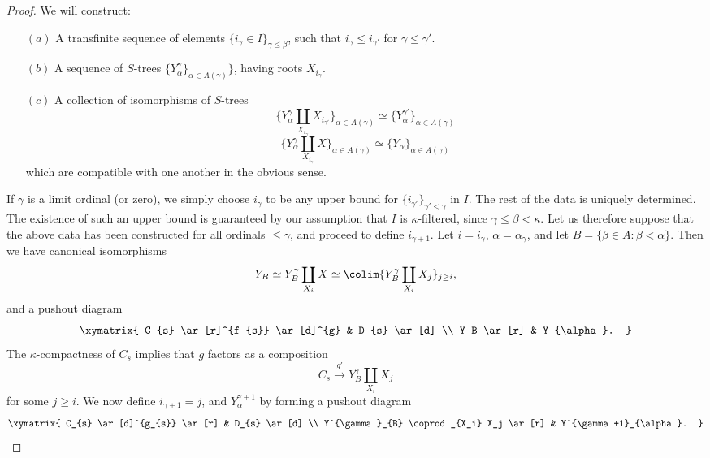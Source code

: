 \begin{CategoryTheory}
\begin{Didn't Read}
\begin{proof}
We will construct:
\begin{itemize}
\item[$(a)$] A transfinite sequence of elements $\{ i_{\gamma} \in I \}_{\gamma \leq \beta}$, such that $i_{\gamma} \leq i_{\gamma'}$ for $\gamma \leq \gamma'$. 
\item[$(b)$] A sequence of $S$-trees $\{ Y^{\gamma}_{\alpha} \}_{\alpha \in A(\gamma)} \}$, having roots $X_{i_{\gamma}}$. 
\item[$(c)$] A collection of isomorphisms of $S$-trees
$$ \{ Y^{\gamma}_{\alpha} \coprod_{X_{i_{\gamma}}} X_{i_{\gamma'}} \}_{\alpha \in A(\gamma)}
\simeq \{ Y^{\gamma'}_{\alpha} \}_{\alpha \in A(\gamma)}$$
$$ \{ Y^{\gamma}_{\alpha} \coprod_{ X_{i_{\gamma}}} X \}_{\alpha \in A(\gamma)}
\simeq \{ Y_{\alpha} \}_{ \alpha \in A(\gamma) }$$
which are compatible with one another in the obvious sense.
\end{itemize}
If $\gamma$ is a limit ordinal (or zero), we simply choose $i_{\gamma}$ to be
any upper bound for $\{ i_{\gamma'} \}_{\gamma' < \gamma}$ in $I$. The rest of the data is uniquely determined. The existence of such an upper bound is guaranteed by our assumption that $I$ is $\kappa$-filtered, since $\gamma \leq \beta < \kappa$. Let us therefore suppose that the above data has been constructed for all ordinals $\leq \gamma$, and proceed to define $i_{\gamma+1}$.
Let $i = i_{\gamma}$, $\alpha = \alpha_{\gamma}$, and let $B = \{ \beta \in A: \beta < \alpha \}$. Then
we have canonical isomorphisms
$$Y_{B} \simeq Y^{\gamma}_{B} \coprod_{X_i} X
\simeq \colim \{ Y^{\gamma}_{B} \coprod_{X_i} X_j \}_{j \geq i},$$
and a pushout diagram
$$ \xymatrix{ C_{s} \ar[r]^{f_{s}} \ar[d]^{g} & D_{s} \ar[d] \\
Y_B \ar[r] & Y_{\alpha}. }$$
The $\kappa$-compactness of $C_{s}$ implies that $g$ factors as a composition
$$ C_{s} \stackrel{g'}{\rightarrow} Y^{\gamma}_{B} \coprod_{ X_i} X_j $$
for some $j \geq i$. We now define $i_{\gamma+1} = j$, and
$Y^{\gamma+1}_{\alpha}$ by forming a pushout diagram
$$ \xymatrix{ C_{s} \ar[d]^{g_{s}} \ar[r] & D_{s} \ar[d] \\
Y^{\gamma}_{B} \coprod_{X_i} X_j \ar[r] & Y^{\gamma+1}_{\alpha}. }$$
\end{proof}


\end{Didn't Read}
\end{CategoryTheory}
